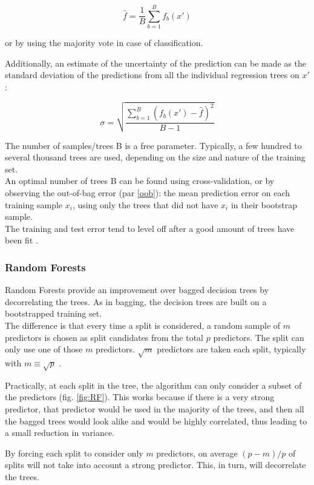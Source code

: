 \begin{equation}
{{\hat {f}}={\frac {1}{B}}\sum _{b=1}^{B}f_{b}(x')}
\end{equation}

or by using the majority vote in case of classification.

Additionally, an estimate of the uncertainty of the prediction can be made as the standard deviation of the predictions from all the individual regression trees on $x'$:

\begin{equation}
	{\sigma ={\sqrt {\frac {\sum_{b=1}^{B}(f_{b}(x')-{\hat {f}})^{2}}{B-1}}}}
\end{equation}

The number of samples/trees B is a free parameter. Typically, a few hundred to several thousand trees are used, depending on the size and nature of the training set. \\
An optimal number of trees B can be found using cross-validation, or by observing the out-of-bag error (par \ref{oob}): the mean prediction error on each training sample $x_i$, using only the trees that did not have $x_i$ in their bootstrap sample. \\
The training and test error tend to level off after a good amount of trees have been fit \cite{ISLR}.

\subsubsection{Random Forests}
Random Forests provide an improvement over bagged decision trees by decorrelating the trees. As in bagging, the decision trees are built on a bootstrapped training set. \\
The difference is that every time a split is considered, a random sample of $m$ predictors is chosen as split candidates from the total $p$ predictors. The split can only use one of those $m$ predictors. $\sqrt{m}$ predictors are taken each split, typically with $m \equiv \sqrt{p}$ \cite{ISLR}.

Practically, at each split in the tree, the algorithm can only consider a subset of the predictors (fig. \ref{fig:RF}). This works because if there is a very strong predictor, that predictor would be used in the majority of the trees, and then all the bagged trees would look alike and would be highly correlated, thus leading to a small reduction in variance.

By forcing each split to consider only $m$ predictors, on average $(p - m)/p$ of splits will not take into account a strong predictor. This, in turn, will decorrelate the trees.

